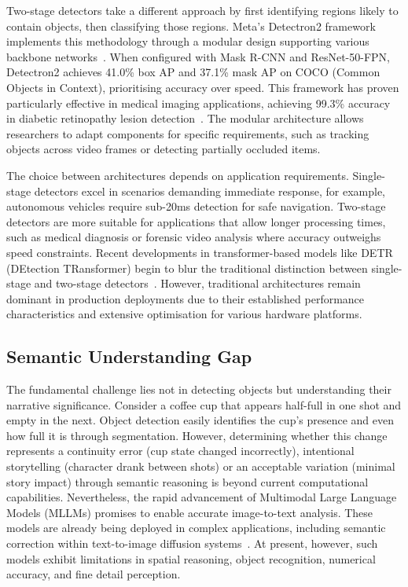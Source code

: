 Two-stage detectors take a different approach by first identifying regions likely to contain objects, then classifying those regions. Meta's Detectron2 framework implements this methodology through a modular design supporting various backbone networks~\cite{lv2023}. When configured with Mask R-CNN and ResNet-50-FPN, Detectron2 achieves 41.0\% box AP and 37.1\% mask AP on COCO (Common Objects in Context), prioritising accuracy over speed. This framework has proven particularly effective in medical imaging applications, achieving 99.3\% accuracy in diabetic retinopathy lesion detection~\cite{premiumbeat2023}. The modular architecture allows researchers to adapt components for specific requirements, such as tracking objects across video frames or detecting partially occluded items.

The choice between architectures depends on application requirements. Single-stage detectors excel in scenarios demanding immediate response, for example, autonomous vehicles require sub-20ms detection for safe navigation. Two-stage detectors are more suitable for applications that allow longer processing times, such as medical diagnosis or forensic video analysis where accuracy outweighs speed constraints. Recent developments in transformer-based models like DETR (DEtection TRansformer) begin to blur the traditional distinction between single-stage and two-stage detectors~\cite{carion2020}. However, traditional architectures remain dominant in production deployments due to their established performance characteristics and extensive optimisation for various hardware platforms.

\subsection{Semantic Understanding Gap}

The fundamental challenge lies not in detecting objects but understanding their narrative significance. Consider a coffee cup that appears half-full in one shot and empty in the next. Object detection easily identifies the cup's presence and even how full it is through segmentation. However, determining whether this change represents a continuity error (cup state changed incorrectly), intentional storytelling (character drank between shots) or an acceptable variation (minimal story impact) through semantic reasoning is beyond current computational capabilities. Nevertheless, the rapid advancement of Multimodal Large Language Models (MLLMs) promises to enable accurate image-to-text analysis. These models are already being deployed in complex applications, including semantic correction within text-to-image diffusion systems~\cite{tan2020}. At present, however, such models exhibit limitations in spatial reasoning, object recognition, numerical accuracy, and fine detail perception.

